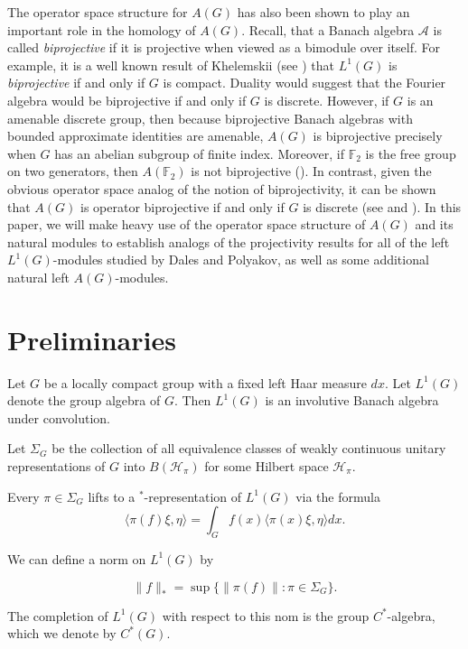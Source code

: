 \documentclass[10pt]{amsart}
\numberwithin{thm}{section}
\numberwithin{equation}{section}
\begin{document}
The operator space structure for $A(G)$ has also been shown to play an important role in the homology of $A(G)$. 
Recall, that a Banach algebra $\mathcal{A}$ is called \textit{biprojective} if it is projective 
 when viewed as a bimodule over itself.  For example, 
it is a well known result of Khelemskii (see \cite{Hel}) that $L^{1}(G)$ is \textit{biprojective} if and only if $G$ is compact.
Duality would suggest that the Fourier algebra would be biprojective if and only if $G$ is discrete. 
However, if $G$ is an amenable discrete group, then because biprojective Banach algebras with bounded approximate 
identities are amenable, $A(G)$ is biprojective precisely when $G$ has an abelian 
subgroup of finite index. Moreover, if $\mathbb{F}_2$ is the free group on two generators, then $A(\mathbb{F}_2)$ is not biprojective (\cite{Stei}).
In contrast, given the obvious operator space analog of the notion of biprojectivity, it can be shown that $A(G)$ is operator 
biprojective if and only if $G$ is discrete (see \cite{Ar02} and \cite{W02}). In this paper, we will make heavy use of the 
operator space structure of $A(G)$ and its natural modules to establish analogs of the projectivity results for  
all of the left $L^{1}(G)$-modules studied by Dales and Polyakov, as well as some additional natural left $A(G)$-modules.    
   
\section{Preliminaries}

Let $G$ be a locally compact group with a fixed left Haar measure $dx$. Let $L^{1}(G)$ denote 
the group algebra of $G$. Then $L^{1}(G)$ is an involutive Banach algebra under convolution. 

Let $\Sigma _{G}$ be the collection of all equivalence classes of weakly continuous
unitary representations of $G$ into $B(\mathcal{H}_{\pi })$ for some Hilbert
space $\mathcal{H}_{\pi }.$ 

Every $\pi \in \Sigma _{G}$ lifts to a $^*$-representation of $L^{1}(G)$ via the formula
\[\langle \pi (f) \xi ,\eta \rangle =\int_{G} f(x) \langle \pi (x) \xi ,\eta  \rangle dx.\]

We can define a norm on $L^{1}(G)$ by 

\[\| f\| _{*}=\sup \{\| \pi (f)\| : \pi \in \Sigma_G \}.\]

The completion of $L^{1}(G)$ with respect to this nom is the group $C^*$-algebra, which we denote by 
$C^{*}(G)$.  
\end{document}
